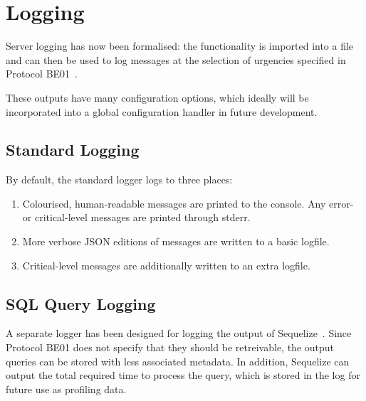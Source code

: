 \section{Logging}
Server logging has now been formalised: the functionality is imported into
a file and can then be used to log messages at the selection of urgencies
specified in Protocol BE01~\cite{protocol}.

These outputs have many configuration options, which ideally will be
incorporated into a global configuration handler in future development.

\subsection{Standard Logging}
By default, the standard logger logs to three places:
\begin{enumerate}
	\item Colourised, human-readable messages are printed to the console.
		Any error- or critical-level messages are printed through stderr.
	\item More verbose JSON editions of messages are written to a basic
		logfile.
	\item Critical-level messages are additionally written to an extra
		logfile.
\end{enumerate}

\subsection{SQL Query Logging}
A separate logger has been designed for logging the output of
Sequelize~\cite{sequelize}. Since Protocol BE01 does not specify that they
should be retreivable, the output queries can be stored with less associated
metadata. In addition, Sequelize can output the total required time to
process the query, which is stored in the log for future use as profiling
data.
